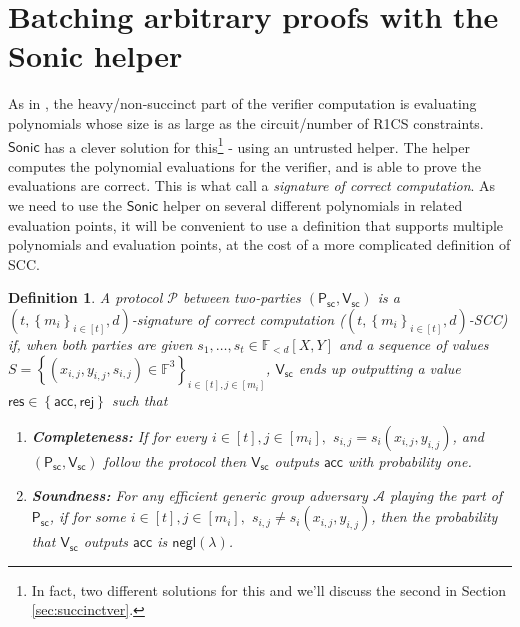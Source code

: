\documentclass[11pt]{article}
\numberwithin{figure}{section} %
\newtheorem{dfn}[thm]{Definition}
\newcommand{\set}[1]{\ensuremath{\left\{#1\right\}}\xspace}
\newcommand{\F}{\ensuremath{\mathbb F}\xspace}
\newcommand{\adv}{\ensuremath{\mathcal A}\xspace}
\newcommand{\negl}{\ensuremath{\mathsf{negl}(\lambda)}\xspace}
\newcommand{\rej}{\ensuremath{\mathsf{rej}}\xspace}
\newcommand{\acc}{\ensuremath{\mathsf{acc}}\xspace}
\newcommand{\res}{\ensuremath{\mathsf{res}}\xspace}
\newcommand{\sett}[2]{\ensuremath{\set{#1}_{#2}}\xspace}
\newcommand{\prf}{\ensuremath{\pi}\xspace}
\newcommand{\sonic}{\ensuremath{\mathsf{Sonic}}\xspace}
\newcommand{\bivar}[1]{\ensuremath{\F_{< #1}[X,Y]}\xspace}
\newcommand{\prot}{\ensuremath{\mathscr{P}}\xspace}
\newcommand{\sigprv}{\ensuremath{\mathsf{P_{sc}}}\xspace}
\newcommand{\sigver}{\ensuremath{\mathsf{V_{sc}}}\xspace}
\begin{document}
\section{Batching arbitrary proofs with the Sonic helper}\label{sec:helpedver}
As in \cite{sonic}, the heavy/non-succinct part of the verifier computation is evaluating polynomials whose size is as large as the circuit/number of R1CS constraints.
\sonic has a clever solution for this\footnote{In fact, two different solutions for this and we'll discuss the second in Section \ref{sec:succinctver}.} - using an untrusted helper. The helper computes the polynomial evaluations for the verifier,
and is able to prove the evaluations are correct. This is what \cite{sonic} call a \emph{signature of correct computation}.
As we need to use the \sonic helper on several different polynomials in related evaluation points, it will be convenient to use a definition that supports multiple polynomials and evaluation points, at the cost of a more complicated definition of SCC.
\begin{dfn}\label{dfn:batchsigs}
  A protocol \prot between two-parties $(\sigprv,\sigver)$ is a  \emph{$(t,\sett{m_i}{i\in [t]},d)$-signature of correct computation} ($(t,\sett{m_i}{i\in [t]},d)$-SCC) if, when both parties are given $s_1,\ldots,s_t\in \bivar{d}$ and a sequence of values $S=\sett{(x_{i,j},y_{i,j},s_{i,j})\in \F^3}{i\in [t],j\in [m_i]}$, \sigver ends up outputting a value $\res\in \set{\acc,\rej}$ such that 
%   
\begin{enumerate}
 \item \textbf{Completeness:} If for every $i\in [t], j\in [m_i],$ $s_{i,j} = s_i(x_{i,j},y_{i,j})$,
 and $(\sigprv,\sigver)$ follow the protocol then
 $\sigver$ outputs \acc with probability one.
 \item \textbf{Soundness:} For any efficient generic group adversary \adv playing the part of \sigprv, if for some $i\in [t], j\in [m_i],$ $s_{i,j} \neq s_i(x_{i,j},y_{i,j})$, then the probability that \sigver outputs \acc is \negl.
\end{enumerate}

\end{dfn}
\end{document}

